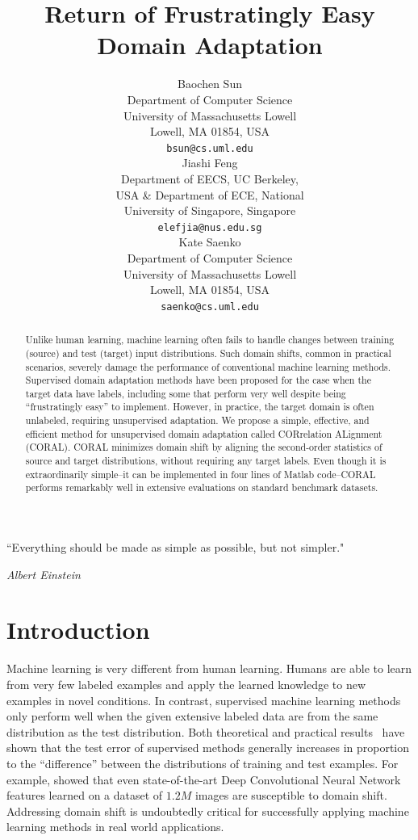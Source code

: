 \documentclass[letterpaper]{article}
\title{Return of Frustratingly Easy Domain Adaptation}
\author{
Baochen Sun\\
Department of Computer Science\\
University of Massachusetts Lowell\\
Lowell, MA 01854, USA \\
\texttt{bsun@cs.uml.edu} \\
\And
Jiashi Feng\\
Department of EECS, UC Berkeley,\\
USA \& Department of ECE, National\\
University of Singapore,  Singapore\\
\texttt{elefjia@nus.edu.sg} \\
\And
Kate Saenko\\
Department of Computer Science\\
University of Massachusetts Lowell\\
Lowell, MA 01854, USA \\
\texttt{saenko@cs.uml.edu} \\
}
\begin{document}
\nocopyright %
\frenchspacing
\maketitle

\begin{abstract}
Unlike human learning, machine learning often fails to handle changes between training (source) and test (target) input distributions. Such domain shifts, common in practical scenarios, severely damage the performance of conventional machine learning methods. 
Supervised domain adaptation methods have been proposed for the case when the target data have labels, including some that perform very well despite being ``frustratingly easy'' to implement. However, in practice, the target domain is often unlabeled, requiring unsupervised adaptation.
We propose a simple, effective, and efficient method for unsupervised domain adaptation called CORrelation ALignment (CORAL). CORAL minimizes domain shift by aligning the second-order statistics of source and target distributions, without requiring any target labels. 
Even though it is extraordinarily simple--it can be implemented in four lines of Matlab code--CORAL performs remarkably well in extensive evaluations on standard benchmark datasets.
\end{abstract}

\epigraph{``Everything should be made as simple as possible, but not simpler."}{\textit{Albert Einstein}}
\section{Introduction}
\label{sec:intro}
Machine learning is very different from human learning. Humans are able to learn from very few labeled examples and apply the learned knowledge to new examples in novel conditions. In contrast, supervised machine learning methods only perform well when the given extensive labeled data are from the same distribution as the test distribution. Both theoretical \cite{bendavid,Blitzer07Biographies} and practical results~\cite{saenko2010adapting,efros-cvpr11} have shown that the test error of supervised methods generally increases in proportion to the ``difference'' between the distributions of training and test examples. For example, \citeauthor{decaf}  showed that even state-of-the-art Deep Convolutional Neural Network features learned on a  dataset of $1.2M$ images are susceptible to domain shift.
Addressing domain shift is undoubtedly critical for successfully applying machine learning methods in real world applications.
\end{document}
